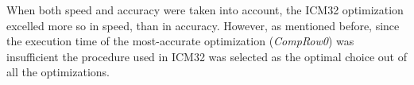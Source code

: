 When both speed and accuracy were taken into account, the ICM32 optimization excelled more so in speed, than in accuracy. However, as mentioned before, since the execution time of the most-accurate optimization (\textit{CompRow0}) was insufficient the procedure used in ICM32 was selected as the optimal choice out of all the optimizations.